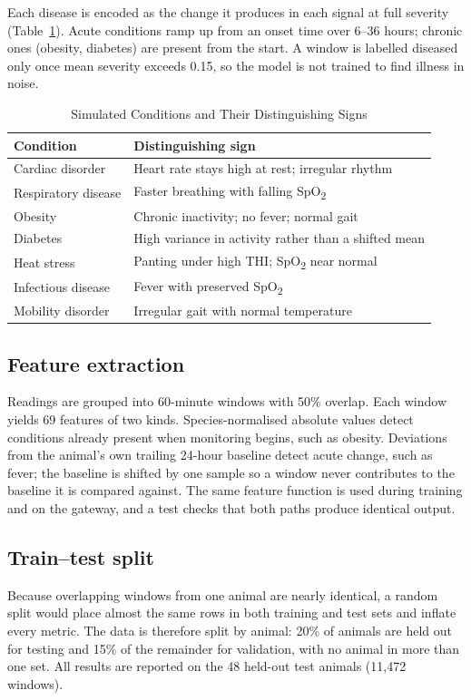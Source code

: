 \documentclass[conference]{IEEEtran}
\begin{document}
Each disease is encoded as the change it produces in each signal at full
severity (Table~\ref{tab:conditions}). Acute conditions ramp up from an onset
time over 6--36 hours; chronic ones (obesity, diabetes) are present from the
start. A window is labelled diseased only once mean severity exceeds 0.15, so
the model is not trained to find illness in noise.

\begin{table}[t]
\caption{Simulated Conditions and Their Distinguishing Signs}
\label{tab:conditions}
\centering
\footnotesize
\begin{tabular}{@{}p{2.55cm}>{\raggedright\arraybackslash}p{5.15cm}@{}}
\toprule
\textbf{Condition} & \textbf{Distinguishing sign} \\
\midrule
Cardiac disorder & Heart rate stays high at rest; irregular rhythm \\
Respiratory disease & Faster breathing with falling SpO\textsubscript{2} \\
Obesity & Chronic inactivity; no fever; normal gait \\
Diabetes & High variance in activity rather than a shifted mean \\
Heat stress & Panting under high THI; SpO\textsubscript{2} near normal \\
Infectious disease & Fever with preserved SpO\textsubscript{2} \\
Mobility disorder & Irregular gait with normal temperature \\
\bottomrule
\end{tabular}
\end{table}

\subsection{Feature extraction}
Readings are grouped into 60-minute windows with 50\% overlap. Each window
yields 69 features of two kinds. Species-normalised absolute values detect
conditions already present when monitoring begins, such as obesity. Deviations
from the animal's own trailing 24-hour baseline detect acute change, such as
fever; the baseline is shifted by one sample so a window never contributes to
the baseline it is compared against. The same feature function is used during
training and on the gateway, and a test checks that both paths produce
identical output.

\subsection{Train--test split}
Because overlapping windows from one animal are nearly identical, a random split
would place almost the same rows in both training and test sets and inflate
every metric. The data is therefore split by animal: 20\% of animals are held
out for testing and 15\% of the remainder for validation, with no animal in
more than one set. All results are reported on the 48 held-out test animals
(11{,}472 windows).
\end{document}
